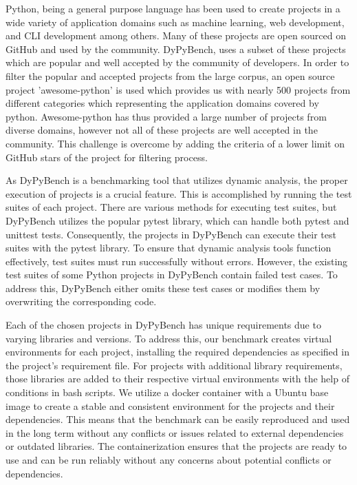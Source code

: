 Python, being a general purpose language has been used to create projects in a wide variety of application domains such as machine learning, web development, and CLI development among others. Many of these projects are open sourced on GitHub and used by the community. DyPyBench, uses a subset of these projects which are popular and well accepted by the community of developers. In order to filter the popular and accepted projects from the large corpus, an open source project 'awesome-python' is used which provides us with nearly 500 projects from different categories which representing the application domains covered by python. Awesome-python has thus provided a large number of projects from diverse domains, however not all of these projects are well accepted in the community. This challenge is overcome by adding the criteria of a lower limit on GitHub stars of the project for filtering process.

As DyPyBench is a benchmarking tool that utilizes dynamic analysis, the proper execution of projects is a crucial feature. This is accomplished by running the test suites of each project. There are various methods for executing test suites, but DyPyBench utilizes the popular pytest library, which can handle both pytest and unittest tests. Consequently, the projects in DyPyBench can execute their test suites with the pytest library. To ensure that dynamic analysis tools function effectively, test suites must run successfully without errors. However, the existing test suites of some Python projects in DyPyBench contain failed test cases. To address this, DyPyBench either omits these test cases or modifies them by overwriting the corresponding code.

Each of the chosen projects in DyPyBench has unique requirements due to varying libraries and versions. To address this, our benchmark creates virtual environments for each project, installing the required dependencies as specified in the project's requirement file. For projects with additional library requirements, those libraries are added to their respective virtual environments with the help of conditions in bash scripts. We utilize a docker container with a Ubuntu base image to create a stable and consistent environment for the projects and their dependencies. This means that the benchmark can be easily reproduced and used in the long term without any conflicts or issues related to external dependencies or outdated libraries. The containerization ensures that the projects are ready to use and can be run reliably without any concerns about potential conflicts or dependencies.

